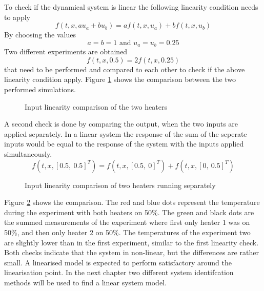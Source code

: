To check if the dynamical system is linear the following linearity condition needs to apply
$$
f(t,x,au_a+bu_b) = af(t,x,u_a) + bf(t,x,u_b)
$$
By choosing the values 
$$
a = b = 1 \text{ and } u_a = u_b = 0.25
$$
Two different experiments are obtained
$$
f(t,x,0.5) = 2f(t,x,0.25)
$$
that need to be performed and compared to each other to check if the above linearity condition apply.
Figure \ref{fig:LinComp} shows the comparison between the two performed simulations.

\begin{figure}[ht]
    \centering
    
    \caption{Input linearity comparison of the two heaters}
    \label{fig:LinComp}
\end{figure}


A second check is done by comparing the output, when the two inputs are applied separately. In a linear system the response of the sum of the seperate inputs would be equal to the response of the system with the inputs applied simultaneously.
$$
f(t,x,[0.5, \ 0.5]^T) = f(t,x,[0.5, \ 0]^T) + f(t,x,[0, \ 0.5]^T)
$$
\begin{figure}[ht]
    \centering
    
    \caption{Input linearity comparison of two heaters running separately}
    \label{fig:linComp2}
\end{figure}

Figure \ref{fig:linComp2} shows the comparison. The red and blue dots represent the temperature during the experiment with both heaters on 50\%. The green and black dots are the summed measurements of the experiment where first only heater 1 was on 50\%, and then only heater 2 on 50\%. The temperatures of the experiment two are slightly lower than in the first experiment, similar to the first linearity check. \\

Both checks indicate that the system in non-linear, but the differences are rather small. A linearised model is expected to perform satisfactory around the linearisation point. In the next chapter two different system identifcation methods will be used to find a linear system model.

